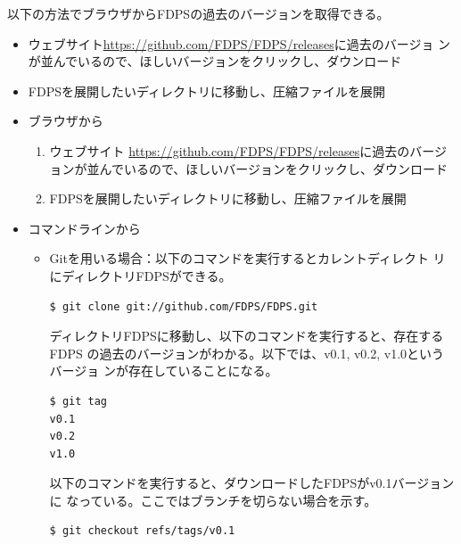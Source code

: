 以下の方法でブラウザからFDPSの過去のバージョンを取得できる。
\begin{itemize}
\item ウェブサイト\url{https://github.com/FDPS/FDPS/releases}に過去のバージョ
  ンが並んでいるので、ほしいバージョンをクリックし、ダウンロード
\item FDPSを展開したいディレクトリに移動し、圧縮ファイルを展開
\end{itemize}
\begin{itemize}
\item ブラウザから
  \begin{enumerate}
  \item ウェブサイト \url{https://github.com/FDPS/FDPS/releases}に過去のバージョンが並んでいるので、ほしいバージョンをクリックし、ダウンロード
  \item FDPSを展開したいディレクトリに移動し、圧縮ファイルを展開
  \end{enumerate}

\item コマンドラインから
  \begin{itemize}
    
  \item Gitを用いる場合：以下のコマンドを実行するとカレントディレクト
    リにディレクトリFDPSができる。
    \begin{screen}
\begin{verbatim}
$ git clone git://github.com/FDPS/FDPS.git
\end{verbatim}
    \end{screen}

    ディレクトリFDPSに移動し、以下のコマンドを実行すると、存在するFDPS
    の過去のバージョンがわかる。以下では、v0.1, v0.2, v1.0というバージョ
    ンが存在していることになる。
    \begin{screen}
\begin{verbatim}
$ git tag
v0.1
v0.2
v1.0
\end{verbatim}
    \end{screen}

    以下のコマンドを実行すると、ダウンロードしたFDPSがv0.1バージョンに
    なっている。ここではブランチを切らない場合を示す。
    \begin{screen}     
\begin{verbatim}
$ git checkout refs/tags/v0.1
\end{verbatim}
    \end{screen}

  \end{itemize}

\end{itemize}
\fi
